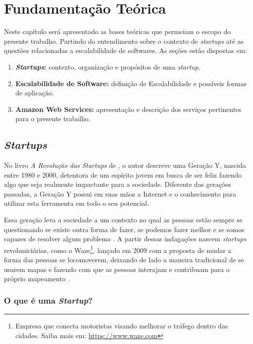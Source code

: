 \chapter[Fundamentação Teórica]{Fundamentação Teórica}

Neste capítulo será apresentado as bases teóricas que permeiam o escopo
do presente trabalho. Partindo do entendimento sobre o contexto de
\textit{startups} até as questões relacionadas a escalabilidade de softwares.
As seções estão dispostas em:

  \begin{enumerate}
    \item \textbf{\textit{Startups}:} contexto, organização e propósitos de uma 
      \textit{startup}.
    \item \textbf{Escalabilidade de Software:} definição de Escalabilidade e 
      possíveis formas de aplicação.
    \item \textbf{Amazon Web Services:} apresentação e descrição dos serviços
    pertinentes para o presente trabalho.
  \end{enumerate}

\section{\textit{Startups}}

No livro \textit{A Revolução das Startups} de ,
o autor descreve uma Geração Y, nascida entre 1980 e 2000, detentora de um
espírito jovem em busca de ser feliz fazendo algo que seja realmente
impactante para a sociedade. Diferente das gerações passadas, a Geração Y
possui em suas mãos a Internet e o conhecimento para utilizar esta
ferramenta em todo o seu potencial.

Essa geração leva a sociedade a um contexto no qual as pessoas estão sempre
se questionando se existe outra forma de fazer, se podemos fazer melhor e
se somos capazes de resolver algum problema \cite{ARevolucaoDasStartups}.
A partir dessas indagações nascem \textit{startups} revoluniciárias, como
o Waze\footnote{Empresa que conecta motoristas visando melhorar o tráfego
dentro das cidades. Saiba mais em: \url{https://www.waze.com}}, lançado em
2009 com a proposta de mudar a forma das pessoas se locomoverem, deixando 
de lado a maneira tradicional de se usarem mapas e fazendo com que as 
pessoas interajam e contribuam para o próprio mapeamento
\cite{NepomucenoSucessoDoWaze}.

\subsection[OQueEStartup]{O que é uma \textit{Startup}?}
\label{sec:OQueEUmaStartup}

